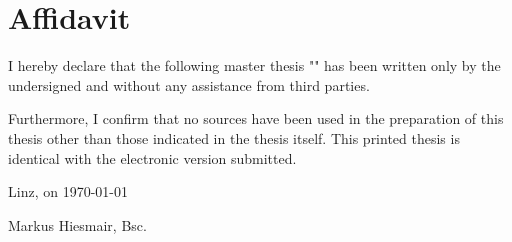 \chapter*{Affidavit}

I hereby declare that the following master thesis "\thesistitle{}" has been written only by the undersigned and without any assistance from third parties.

Furthermore, I confirm that no sources have been used in the preparation of this thesis other than those indicated in the thesis itself. This printed thesis is identical with the electronic version submitted.

Linz, on \today

\hfill Markus Hiesmair, Bsc.
